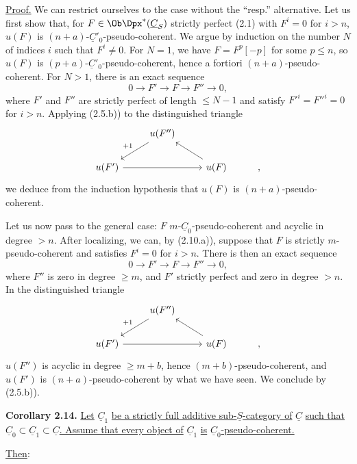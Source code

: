 \uline{Proof.} We can restrict ourselves to the case without the ``resp.'' alternative. Let us first show that, for \(F\in\Ob\Dpx^*(\underline{C}_S)\) strictly perfect (2.1) with \(F^i=0\) for \(i>n\), \(u(F)\) is \((n+a)\)-\(\underline{C}'_0\)-pseudo-coherent. We argue by induction on the number \(N\) of indices \(i\) such that \(F^i\neq0\). For \(N=1\),
%
we have \(F=F^p[-p]\) for some \(p\leq n\), so \(u(F)\) is \((p+a)\)-\(\underline{C}'_0\)-pseudo-coherent, hence a fortiori \((n+a)\)-pseudo-coherent. For \(N>1\), there is an exact sequence
\[
  0\longrightarrow F'\longrightarrow F\longrightarrow F''\longrightarrow 0,
\]
where \(F'\) and \(F''\) are strictly perfect of length \(\leq N-1\) and satisfy \(F'^i=F''^i=0\) for \(i>n\). Applying (2.5.b)) to the distinguished triangle
\[
\begin{tikzcd}
& u(F'') \arrow[dl,"+1"'] & \\
u(F') \arrow[rr] && u(F) \arrow[ul] & ,
\end{tikzcd}
\]
we deduce from the induction hypothesis that \(u(F)\) is \((n+a)\)-pseudo-coherent.

Let us now pass to the general case: \(F\) \(m\)-\(\underline{C}_0\)-pseudo-coherent and acyclic in degree \(>n\). After localizing, we can, by (2.10.a)), suppose that \(F\) is strictly \(m\)-pseudo-coherent and satisfies \(F^i=0\) for \(i>n\). There is then an exact sequence
\[
  0\longrightarrow F'\longrightarrow F\longrightarrow F''\longrightarrow 0,
\]
where \(F''\) is zero in degree \(\geq m\), and \(F'\) strictly perfect and zero in degree \(>n\). In the distinguished triangle
\[
\begin{tikzcd}
& u(F'') \arrow[dl,"+1"'] & \\
u(F') \arrow[rr] && u(F) \arrow[ul] & ,
\end{tikzcd}
\]
\(u(F'')\) is acyclic in degree \(\geq m+b\), hence \((m+b)\)-pseudo-coherent, and \(u(F')\) is \((n+a)\)-pseudo-coherent by what we have seen. We conclude by (2.5.b)).

\textbf{Corollary 2.14.} \uline{Let} \(\underline{C}_1\) \uline{be a strictly full additive sub-}\(\underline{S}\)\uline{-category of} \(\underline{C}\) \uline{such that} \(\underline{C}_0\subset\underline{C}_1\subset\underline{C}\)\uline{. Assume that every object of} \(\underline{C}_1\) \uline{is} \(\underline{C}_0\)\uline{-pseudo-coherent.}

%
\uline{Then}:

